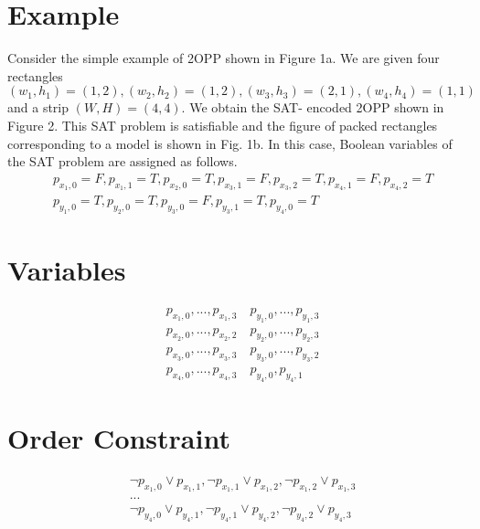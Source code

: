 \documentclass[a4paper,11pt]{book}
\begin{document}
\section{Example}

Consider the simple example of 2OPP shown in Figure 1a. We are given four rectangles $(w_1,h_1) = (1,2),(w_2,h_2) = (1,2),(w_3,h_3) = (2, 1), (w_4, h_4) = (1, 1)$ and a strip $(W, H) = (4, 4)$. We obtain the SAT- encoded 2OPP shown in Figure 2. This SAT problem is satisfiable and the figure of packed rectangles corresponding to a model is shown in Fig. 1b. In this case, Boolean variables of the SAT problem are assigned as follows.
\begin{equation}
	\begin{aligned}
		& p_{x_1,0} = F, p_{x_1,1} = T, p_{x_2,0} = T, p_{x_3,1} = F, p_{x_3,2} = T, p_{x_4,1} = F, p_{x_4,2} = T \\
		& p_{y_1,0} = T, p_{y_2,0} = T, p_{y_3,0} = F, p_{y_3,1} = T, p_{y_4,0} = T
	\end{aligned}
\end{equation}

\section{Variables}

\begin{equation}
	\begin{aligned}
		& p_{x_1,0},...,p_{x_1,3} \quad p_{y_1,0},...,p_{y_1,3} \\
		& p_{x_2,0},...,p_{x_2,2} \quad p_{y_2,0},...,p_{y_2,3} \\
		& p_{x_3,0},...,p_{x_3,3} \quad p_{y_3,0},...,p_{y_3,2} \\
		& p_{x_4,0},...,p_{x_4,3} \quad p_{y_4,0},p_{y_4,1}
	\end{aligned}
\end{equation}

\section{Order Constraint}

\begin{equation}
	\begin{aligned}
		& \neg p_{x_1,0} \lor p_{x_1,1}, \neg p_{x_1,1} \lor p_{x_1,2}, \neg p_{x_1,2} \lor p_{x_1,3} \\
		&...\\
		& \neg p_{y_4,0} \lor p_{y_4,1}, \neg p_{y_4,1} \lor p_{y_4,2}, \neg p_{y_4,2} \lor p_{y_4,3}
	\end{aligned}
\end{equation}
\end{document}
